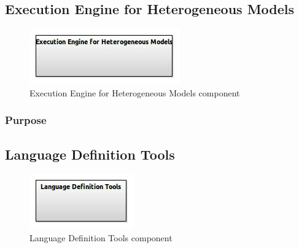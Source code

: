 \documentclass{gemoc} %
\begin{document}


\subsection{Execution Engine for Heterogeneous Models}

\begin{figure}[htp]
	\begin{center}
	\includegraphics*[trim=0.0cm 0.0cm 0cm 0.0cm, clip=true, scale=1.0]{../images/generated/Generated_Execution Engine for Heterogeneous Models.jpg}
	\caption{Execution Engine for Heterogeneous Models component}
	\end{center}
\end{figure}

\subsubsection{Purpose}



\subsection{Language Definition Tools}

\begin{figure}[htp]
	\begin{center}
	\includegraphics*[trim=0.0cm 0.0cm 0cm 0.0cm, clip=true, scale=1.0]{../images/generated/Generated_Language Definition Tools.jpg}
	\caption{Language Definition Tools component}
	\end{center}
\end{figure}
\end{document}
